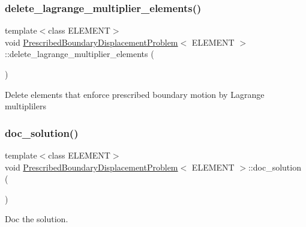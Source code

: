 \subsubsection{\texorpdfstring{delete\+\_\+lagrange\+\_\+multiplier\+\_\+elements()}{delete\_lagrange\_multiplier\_elements()}\hspace{0.1cm}{\footnotesize\ttfamily [2/2]}}
{\footnotesize\ttfamily template$<$class E\+L\+E\+M\+E\+NT$>$ \\
void \hyperlink{classPrescribedBoundaryDisplacementProblem}{Prescribed\+Boundary\+Displacement\+Problem}$<$ E\+L\+E\+M\+E\+NT $>$\+::delete\+\_\+lagrange\+\_\+multiplier\+\_\+elements (\begin{DoxyParamCaption}{ }\end{DoxyParamCaption})\hspace{0.3cm}{\ttfamily [private]}}

Delete elements that enforce prescribed boundary motion by Lagrange multiplilers \mbox{\label{classPrescribedBoundaryDisplacementProblem_abc58821d6b49cd9773dcd90b240aab6e}} 
\subsubsection{\texorpdfstring{doc\+\_\+solution()}{doc\_solution()}\hspace{0.1cm}{\footnotesize\ttfamily [1/3]}}
{\footnotesize\ttfamily template$<$class E\+L\+E\+M\+E\+NT$>$ \\
void \hyperlink{classPrescribedBoundaryDisplacementProblem}{Prescribed\+Boundary\+Displacement\+Problem}$<$ E\+L\+E\+M\+E\+NT $>$\+::doc\+\_\+solution (\begin{DoxyParamCaption}{ }\end{DoxyParamCaption})}



Doc the solution. 

\mbox{\label{classPrescribedBoundaryDisplacementProblem_abc58821d6b49cd9773dcd90b240aab6e}} 
